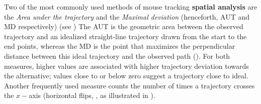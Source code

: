 \documentclass{article}
\begin{document}
Two of the most commonly used methods of mouse tracking \textbf{spatial analysis} are the \textit{Area under the trajectory} and the \textit{Maximal deviation} (henceforth, AUT and MD respectively) (see \citealp{Freeman2010})
The AUT is the geometric area between the observed trajectory and an idealized straight-line trajectory drawn from the start to the end points, whereas the MD is the point that maximizes the perpendicular distance between this ideal trajectory and the observed path
(). For both measures, higher values are associated with higher trajectory deviation towards the alternative; values close to or below zero suggest a trajectory close to ideal. 
Another frequently used measure  counts the number of times a trajectory crosses the $x-$axis (horizontal flips, \citealp{Dale2011}, as illustrated in ).
\end{document}
